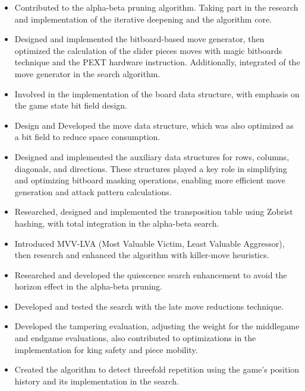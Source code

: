\begin{itemize}[itemsep=1pt]

    \item Contributed to the alpha-beta pruning algorithm. Taking part in the research and implementation of the iterative deepening and the algorithm core.

    \item Designed and implemented the bitboard-based move generator, then optimized the calculation of the slider pieces moves with magic bitboards technique and the PEXT hardware instruction. Additionally, integrated of the move generator in the search algorithm.

    \item Involved in the implementation of the board data structure, with emphasis on the game state bit field design.

    \item Design and Developed the move data structure, which was also optimized as a bit field to reduce space consumption.    

    \item Designed and implemented the auxiliary data structures for rows, columns, diagonals, and directions. These structures played a key role in simplifying and optimizing bitboard masking operations, enabling more efficient move generation and attack pattern calculations.
    
    \item Researched, designed and implemented the transposition table using Zobrist hashing, with total integration in the alpha-beta search.

    \item Introduced MVV-LVA (Most Valuable Victim, Least Valuable Aggressor), then research and enhanced the algorithm with killer-move heuristics.

    \item Researched and developed the quiescence search enhancement to avoid the horizon effect in the alpha-beta pruning.

    \item Developed and tested the search with the late move reductions technique.

    \item Developed the tampering evaluation, adjusting the weight for the middlegame and endgame evaluations, also contributed to optimizations in the implementation for king safety and piece mobility.

    \item Created the algorithm to detect threefold repetition using the game's position history and its implementation in the search.


\end{itemize}
